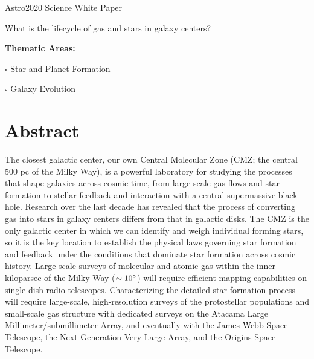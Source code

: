 \documentclass[modern]{aastex62}
\begin{document}
{\center
\huge
Astro2020 Science White Paper \linebreak

What is the lifecycle of gas and stars in galaxy centers? 
\vspace{5mm}
}

{
\noindent \textbf{Thematic Areas:}

\noindent $\square$ Star and Planet Formation 

\noindent $\square$ Galaxy Evolution  
}
% 
%  

\vspace{5mm}
\author{Adam Ginsburg}
\author{Elisabeth A.~C.~Mills}
\author{Cara D.~Battersby}
\author{Steven N.~Longmore}
\author{J.~M.~Diederik Kruijssen}


\section*{}



\vspace{-1.5cm}


\section*{Abstract}
The closest galactic center, our own Central Molecular Zone (CMZ; the
central 500 pc of the Milky Way), is a powerful laboratory for studying the
processes that shape galaxies across cosmic time, from large-scale gas flows
and star formation to stellar feedback and interaction with a central
supermassive black hole. Research over the last decade has revealed that the
process of converting gas into stars in galaxy centers differs from 
that in galactic disks. The CMZ is the only galactic center in which
we can identify and weigh individual forming stars, so it is the key location
to establish the physical laws governing star formation and feedback under the
conditions that dominate star formation across cosmic history. Large-scale surveys
of molecular and atomic gas within the inner kiloparsec of the Milky Way
($\sim10^{\circ}$) will require efficient mapping capabilities on single-dish
radio telescopes. Characterizing the detailed star formation process will
require large-scale, high-resolution surveys of the protostellar populations
and small-scale gas structure with dedicated surveys on the Atacama Large
Millimeter/submillimeter Array, and eventually with the James Webb Space
Telescope, the Next Generation Very Large Array, and the Origins Space
Telescope.
\vspace{5mm}
\end{document}
